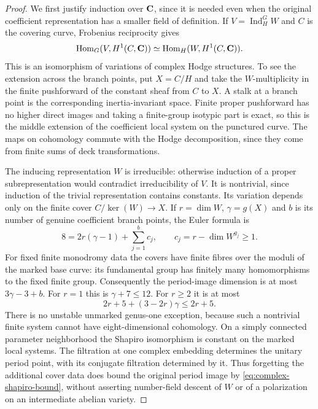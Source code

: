 \begin{proof}
We first justify induction over $\mathbf C$, since it is needed even when the original coefficient representation has a smaller field of definition. If $V=\operatorname{Ind}_H^G W$ and $C$ is the covering curve, Frobenius reciprocity gives
\[
 \operatorname{Hom}_G(V,H^1(C,\mathbf C))
 \simeq\operatorname{Hom}_H(W,H^1(C,\mathbf C)).
\]
This is an isomorphism of variations of complex Hodge structures. To see the extension across the branch points, put $X=C/H$ and take the $W$-multiplicity in the finite pushforward of the constant sheaf from $C$ to $X$. A stalk at a branch point is the corresponding inertia-invariant space. Finite proper pushforward has no higher direct images and taking a finite-group isotypic part is exact, so this is the middle extension of the coefficient local system on the punctured curve. The maps on cohomology commute with the Hodge decomposition, since they come from finite sums of deck transformations.

The inducing representation $W$ is irreducible: otherwise induction of a proper subrepresentation would contradict irreducibility of $V$. It is nontrivial, since induction of the trivial representation contains constants. Its variation depends only on the finite cover $C/\ker(W)\to X$. If $r=\dim W$, $\gamma=g(X)$ and $b$ is its number of genuine coefficient branch points, the Euler formula is
\begin{equation}\label{eq:complex-cover-budget}
 8=2r(\gamma-1)+\sum_{j=1}^{b}c_j,
 \qquad c_j=r-\dim W^{g_j}\ge1.
\end{equation}
For fixed finite monodromy data the covers have finite fibres over the moduli of the marked base curve: its fundamental group has finitely many homomorphisms to the fixed finite group. Consequently the period-image dimension is at most $3\gamma-3+b$. For $r=1$ this is $\gamma+7\le12$. For $r\ge2$ it is at most
\begin{equation}\label{eq:complex-shapiro-bound}
 2r+5+(3-2r)\gamma\le2r+5.
\end{equation}
There is no unstable unmarked genus-one exception, because such a nontrivial finite system cannot have eight-dimensional cohomology. On a simply connected parameter neighborhood the Shapiro isomorphism is constant on the marked local systems. The filtration at one complex embedding determines the unitary period point, with its conjugate filtration determined by it. Thus forgetting the additional cover data does bound the original period image by \eqref{eq:complex-shapiro-bound}, without asserting number-field descent of $W$ or of a polarization on an intermediate abelian variety.


\end{proof}

